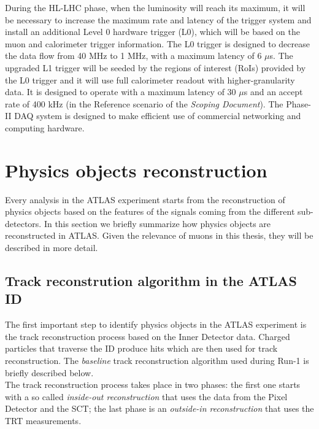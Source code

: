 \documentclass[a4paper,twoside,12pt]{book}
\begin{document}
During the HL-LHC phase, when the luminosity will reach its maximum, it will be necessary
to increase the maximum rate and latency of the trigger system and install an additional Level 0 hardware trigger (L0), which will be based on the muon and calorimeter trigger information. The L0 trigger is designed to decrease the data flow from 40 MHz to 1 MHz, with a maximum latency of 6 $\mu$s. The upgraded L1 trigger will be seeded by the regions of interest (RoIs) provided by the L0 
trigger and it will use full calorimeter readout with higher-granularity data. It is designed to
operate with a maximum latency of 30 $\mu$s and an accept rate of 400 kHz (in the Reference scenario of the \textit{Scoping Document}\cite{scoping}). The Phase-II DAQ system is designed to make 
efficient use of commercial networking and computing hardware. 

\clearpage


\chapter{Physics objects reconstruction}

Every analysis in the ATLAS experiment starts from the reconstruction of physics objects
based on the features of the signals coming from the different sub-detectors\cite{PhysicsObjectReconstruction}. In this section we briefly
summarize how physics objects are reconstructed in ATLAS. Given the relevance of muons in this thesis, they will be described in more detail.\\

\section{Track reconstrution algorithm in the ATLAS ID}
The first important step to identify physics objects in the ATLAS experiment is the track reconstruction process based on the Inner Detector data. Charged particles that
traverse the ID produce hits which are then used for track reconstruction. The \textit{baseline} track reconstruction
algorithm\cite{OptimizationTrackReconstructionAlgorithm} used during Run-1 is briefly described below.\\

The track reconstruction process takes place in two phases: the first one starts with a so called \textit{inside-out reconstruction} that uses the data from the Pixel Detector and the SCT; the last phase is an \textit{outside-in reconstruction} that uses the TRT measurements. \\
\end{document}
